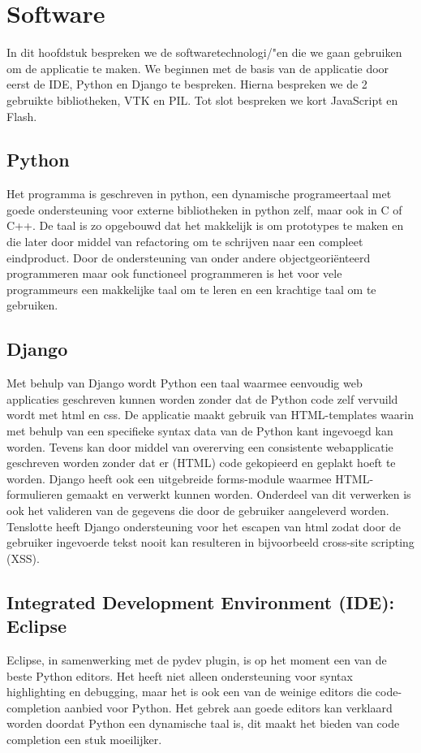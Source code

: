 \section{Software}
\label{Software}
In dit hoofdstuk bespreken we de softwaretechnologi/"{e}n die we gaan gebruiken om de applicatie te maken.
We beginnen met de basis van de applicatie door eerst de IDE, Python en Django te bespreken.
Hierna bespreken we de 2 gebruikte bibliotheken, VTK en PIL.
Tot slot bespreken we kort JavaScript en Flash.

\subsection{Python}
Het programma is geschreven in python, een dynamische programeertaal met goede ondersteuning voor externe bibliotheken in python zelf, maar ook in C of C++. 
De taal is zo opgebouwd dat het makkelijk is om prototypes te maken en die later door middel van refactoring om te schrijven naar een compleet eindproduct. 
Door de ondersteuning van onder andere objectgeori\"{e}nteerd programmeren maar ook functioneel programmeren is het voor vele programmeurs een makkelijke taal om te leren en een krachtige taal om te gebruiken.

\subsection{Django}
Met behulp van Django wordt Python een taal waarmee eenvoudig web applicaties geschreven kunnen worden zonder dat de Python code zelf vervuild wordt met html en css. 
De applicatie maakt gebruik van HTML-templates waarin met behulp van een specifieke syntax data van de Python kant ingevoegd kan worden. 
Tevens kan door middel van overerving een consistente webapplicatie geschreven worden zonder dat er (HTML) code gekopieerd en geplakt hoeft te worden. 
Django heeft ook een uitgebreide forms-module waarmee HTML-formulieren gemaakt en verwerkt kunnen worden. 
Onderdeel van dit verwerken is ook het valideren van de gegevens die door de gebruiker aangeleverd worden.
Tenslotte heeft Django ondersteuning voor het escapen van html zodat door de gebruiker ingevoerde tekst nooit kan resulteren in bijvoorbeeld cross-site scripting (XSS).

\subsection{Integrated Development Environment (IDE): Eclipse}
Eclipse, in samenwerking met de pydev plugin, is op het moment een van de beste Python editors. 
Het heeft niet alleen ondersteuning voor syntax highlighting en debugging, maar het is ook een van de weinige editors die code-completion aanbied voor Python. 
Het gebrek aan goede editors kan verklaard worden doordat Python een dynamische taal is, dit maakt het bieden van code completion een stuk moeilijker.


